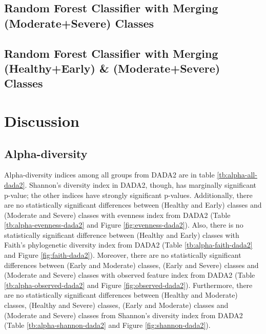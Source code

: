 \documentclass[a4paper]{article}
\begin{document}
{        \subsection{Random Forest Classifier with Merging (Moderate+Severe) Classes}

        \subsection{Random Forest Classifier with Merging (Healthy+Early) \& (Moderate+Severe) Classes}

    \section{Discussion}
        \subsection{Alpha-diversity}
            Alpha-diversity indices among all groups from DADA2 are in table \ref{tb:alpha-all-dada2}. Shannon's diversity index in DADA2, though, has marginally significant p-value; the other indices have strongly significant p-values. Additionally, there are no statistically significant differences between (Healthy and Early) classes and (Moderate and Severe) classes with evenness index from DADA2 (Table \ref{tb:alpha-evenness-dada2} and Figure \ref{fig:evenness-dada2}). Also, there is no statistically significant difference between (Healthy and Early) classes with Faith's phylogenetic diversity index from DADA2 (Table \ref{tb:alpha-faith-dada2} and Figure \ref{fig:faith-dada2}). Moreover, there are no statistically significant differences between (Early and Moderate) classes, (Early and Severe) classes and (Moderate and Severe) classes with observed feature index from DADA2 (Table \ref{tb:alpha-observed-dada2} and Figure \ref{fig:observed-dada2}). Furthermore, there are no statistically significant differences between (Healthy and Moderate) classes, (Healthy and Severe) classes, (Early and Moderate) classes and (Moderate and Severe) classes from Shannon's diversity index from DADA2 (Table \ref{tb:alpha-shannon-dada2} and Figure \ref{fig:shannon-dada2}).

}
\end{document}
